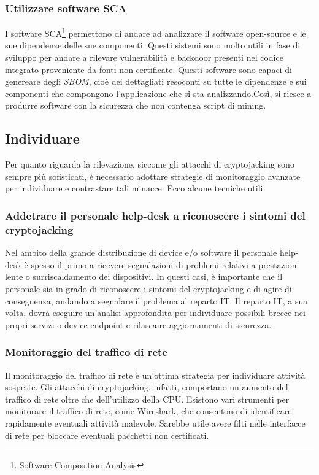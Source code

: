 \documentclass[12pt,a4paper]{article}
\begin{document}
\subsubsection{Utilizzare software SCA}
I software SCA\footnote{Software Composition Analysis} permettono di andare ad
analizzare il software open-source e le sue dipendenze delle sue componenti.
Questi sistemi sono molto utili in fase di sviluppo per andare a rilevare
vulnerabilità e backdoor presenti nel codice integrato proveniente da fonti non
certificate. Questi software sono capaci di genereare degli \textit{SBOM}, cioè
dei dettagliati resoconti su tutte le dipendenze e sui componenti che compongono
l'applicazione che si sta analizzando.Così, si riesce a produrre software con la
sicurezza che non contenga script di mining.

\subsection{Individuare}
Per quanto riguarda la rilevazione, siccome gli attacchi di cryptojacking sono
sempre più sofisticati, è necessario adottare strategie di monitoraggio avanzate
per individuare e contrastare tali minacce. Ecco alcune tecniche utili:

\subsubsection{Addetrare il personale help-desk a riconoscere i sintomi del cryptojacking}
Nel ambito della grande distribuzione di device e/o software il personale
help-desk è spesso il primo a ricevere segnalazioni di problemi relativi a
prestazioni lente o surriscaldamento dei dispositivi. In questi casi, è
importante che il personale sia in grado di riconoscere i sintomi del
cryptojacking e di agire di conseguenza, andando a segnalare il problema al
reparto IT. Il reparto IT, a sua volta, dovrà eseguire un'analisi approfondita
per individuare possibili brecce nei propri servizi o device endpoint e
rilascaire aggiornamenti di sicurezza.

\subsubsection{Monitoraggio del traffico di rete}
Il monitoraggio del traffico di rete è un'ottima strategia per individuare
attività sospette. Gli attacchi di cryptojacking, infatti, comportano un aumento
del traffico di rete oltre che dell'utilizzo della CPU. Esistono vari strumenti
per monitorare il traffico di rete, come Wireshark, che consentono di
identificare rapidamente eventuali attività malevole. Sarebbe utile avere filti
nelle interfacce di rete per bloccare eventuali pacchetti non certificati. 
\end{document}
